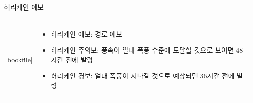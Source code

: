 \begin{frame}[t]{허리케인 예보}
	\begin{tabular}{ll}
		\begin{minipage}[t]{0.6\textwidth}\scriptsize
			\begin{figure}[t]
				\texttt{[image: \\bookfile]}
			\end{figure}
		\end{minipage}	
		&
		\begin{minipage}[t]{0.35\textwidth} \scriptsize	
			\begin{itemize}
				\item 허리케인 예보: 경로 예보
				
				\item 허리케인 주의보: 풍속이 열대 폭풍 수준에 도달할 것으로 보이면 48시간 전에 발령
				\item 허리케인 경보: 열대 폭풍이 지나갈 것으로 예상되면 36시간 전에 발령
				
			\end{itemize}

		\end{minipage}
	\end{tabular}
\end{frame}

